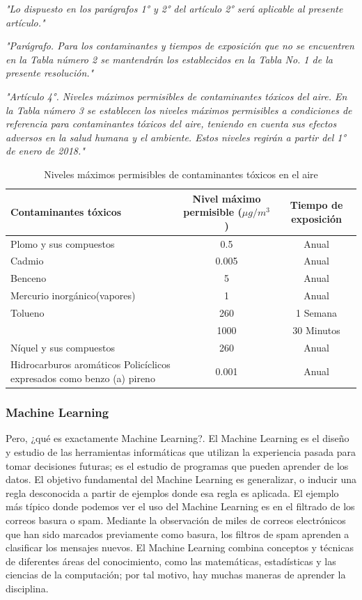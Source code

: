 \textit{"Lo dispuesto en los parágrafos 1° y 2° del artículo 2° será aplicable al presente artículo."}

\textit{"Parágrafo. Para los contaminantes y tiempos de exposición que no se encuentren en la Tabla número 2 se mantendrán los establecidos en la Tabla No. 1 de la presente resolución."}

\textit{"Artículo 4°. Niveles máximos permisibles de contaminantes tóxicos del aire. En la Tabla número 3 se establecen los niveles máximos permisibles a condiciones de referencia para contaminantes tóxicos del aire, teniendo en cuenta sus efectos adversos en la salud humana y el ambiente. Estos niveles regirán a partir del 1° de enero de 2018."}

\begin{table}[h]
	\begin{center}
		\begin{tabular}{| p{4cm} | c | c |}
			\hline
			\rowcolor{lightgray}
			Contaminantes tóxicos 			& Nivel máximo permisible ($ \mu g/m^3 $) 	& Tiempo de exposición	\\ \hline
			Plomo y sus compuestos			& 0.5 		& Anual		\\ \hline
			Cadmio							& 0.005 	& Anual 	\\ \hline
			Benceno							& 5 		& Anual		\\ \hline
			Mercurio inorgánico(vapores)	& 1 		& Anual		\\ \hline
			Tolueno							& 260 		& 1 Semana 	\\ 
											& 1000 		& 30 Minutos\\ \hline
			Níquel y sus compuestos			& 260 		& Anual 	\\ \hline
			Hidrocarburos aromáticos Policíclicos expresados como benzo (a) pireno	& 0.001	& Anual 	\\ \hline
		\end{tabular}
		\caption{Niveles máximos permisibles de contaminantes tóxicos en el aire}
	\end{center}
\end{table}

\subsubsection{Machine Learning}

Pero, ¿qué es exactamente Machine Learning?. El Machine Learning es el diseño y estudio de las herramientas informáticas que utilizan la experiencia pasada para tomar decisiones futuras; es el estudio de programas que pueden aprender de los datos. El objetivo fundamental del Machine Learning es generalizar, o inducir una regla desconocida a partir de ejemplos donde esa regla es aplicada. El ejemplo más típico donde podemos ver el uso del Machine Learning es en el filtrado de los correos basura o spam. Mediante la observación de miles de correos electrónicos que han sido marcados previamente como basura, los filtros de spam aprenden a clasificar los mensajes nuevos. El Machine Learning combina conceptos y técnicas de diferentes áreas del conocimiento, como las matemáticas, estadísticas y las ciencias de la computación; por tal motivo, hay muchas maneras de aprender la disciplina.

